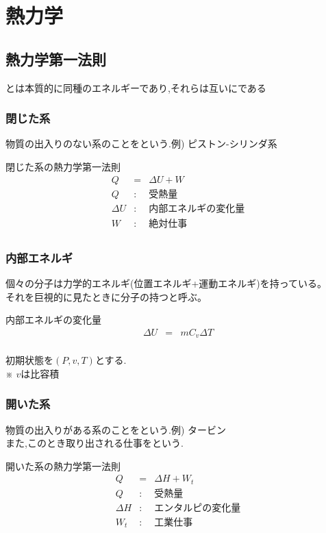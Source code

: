 \documentclass[a4paper]{jsarticle}
\begin{document}
\section{熱力学}
\subsection{熱力学第一法則}
\begin{screen}
    \begin{center}
        とは本質的に同種のエネルギーであり,それらは互いにである
    \end{center}
\end{screen}
\subsubsection{閉じた系}
物質の出入りのない系のことをという.\quad 例) ピストン-シリンダ系
\begin{itembox}[l]{閉じた系の熱力学第一法則}
    \begin{eqnarray*}
        Q&=&\Delta U+W\\
        Q&:&受熱量\\
        \Delta U&:&内部エネルギの変化量\\
        W&:&絶対仕事\\
    \end{eqnarray*}
\end{itembox}
\subsubsection{内部エネルギ}
個々の分子は力学的エネルギ(位置エネルギ+運動エネルギ)を持っている。\\
それを巨視的に見たときに分子の持つと呼ぶ。
\begin{itembox}[l]{内部エネルギの変化量}
    \begin{eqnarray*}
        \Delta U&=&mC_v\Delta T\\
    \end{eqnarray*}
\end{itembox}
初期状態を$\left(P,v,T\right)$とする.\\
※ $v$は比容積
\subsubsection{開いた系}
物質の出入りがある系のことをという.\quad 例) タービン\\
また,このとき取り出される仕事をという.
\begin{itembox}[l]{開いた系の熱力学第一法則}
    \begin{eqnarray*}
        Q&=&\Delta H+W_t\\
        Q&:&受熱量\\
        \Delta H&:&エンタルピの変化量\\
        W_t&:&工業仕事\\
    \end{eqnarray*}
\end{itembox}
\end{document}
